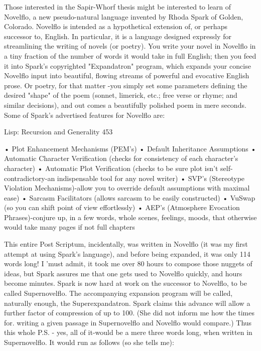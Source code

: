        Those interested in the Sapir-Whorf thesis might be interested to learn of
Novelflo, a new pseudo-natural language invented by Rhoda Spark of Golden,
Colorado. Novelflo is intended as a hypothetical extension of, or perhaps successor to,
English. In particular, it is a language designed expressly for streamlining the writing
of novels (or poetry). You write your novel in Novelflo in a tiny fraction of the
number of words it would take in full English; then you feed it into Spark's
copyrighted "Expandatron" program, which expands your concise Novelflo input into
beautiful, flowing streams of powerful and evocative English prose. Or poetry, for
that matter -you simply set some parameters defining the desired "shape" of the poem
(sonnet, limerick, etc.; free verse or rhyme; and similar decisions), and out comes a
beautifully polished poem in mere seconds. Some of Spark's advertised features for
Novelflo are:




Lisp: Recursion and Generality                                                        453

   • Plot Enhancement Mechanisms (PEM's)
   • Default Inheritance Assumptions
   • Automatic Character Verification (checks for consistency of each character's
     character)
   • Automatic Plot Verification (checks to be sure plot isn't self-contradictory-an
     indispensable tool for any novel writer)
   • SVP's (Stereotype Violation Mechanisms)-allow you to override default
     assumptions with maximal ease)
   • Sarcasm Facilitators (allows sarcasm to be easily constructed)
   • VuSwap (so you can shift point of view effortlessly)
   • AEP's (Atmosphere Evocation Phrases)-conjure up, in a few words, whole
     scenes, feelings, moods, that otherwise would take many pages if not full
     chapters

         This entire Post Scriptum, incidentally, was written in Novelflo (it was my
first attempt at using Spark's language), and before being expanded, it was only 114
words long! I 'must admit, it took me over 80 hours to compose those nuggets of
ideas, but Spark assures me that one gets used to Novelflo quickly, and hours become
minutes.
         Spark is now hard at work on the successor to Novelflo, to be called
Supernovelflo. The accompanying expansion program will be called, naturally
enough, the Superexpandatron. Spark claims this advance will allow a further factor
of compression of up to 100. (She did not inform me how the times for. writing a
given passage in Supernovelflo and Novelflo would compare.) Thus this whole P.S. -
yes, all of it-would be a mere three words long, when written in Supernovelflo. It
would run as follows (so she tells me):

